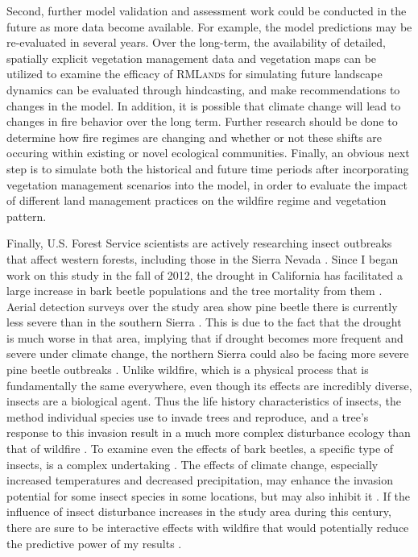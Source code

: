 Second, further model validation and assessment work could be conducted in the future as more data become available. For example, the model predictions may be re-evaluated in several years. Over the long-term, the availability of detailed, spatially explicit vegetation management data and vegetation maps can be utilized to examine the efficacy of \textsc{RMLands} for simulating future landscape dynamics can be evaluated through hindcasting, and make recommendations to changes in the model. In addition, it is possible that climate change will lead to changes in fire behavior over the long term. Further research should be done to determine how fire regimes are changing and whether or not these shifts are occuring within existing or novel ecological communities. Finally, an obvious next step is to simulate both the historical and future time periods after incorporating vegetation management scenarios into the model, in order to evaluate the impact of different land management practices on the wildfire regime and vegetation pattern.

Finally, U.S. Forest Service scientists are actively researching insect outbreaks that affect western forests, including those in the Sierra Nevada \citep{Liebhold2011}. Since I began work on this study in the fall of 2012, the drought in California has facilitated a large increase in bark beetle populations and the tree mortality from them \citep{Fimrite2016}. Aerial detection surveys over the study area show pine beetle there is currently less severe than in the southern Sierra \citep{Moore2015a,Moore2015b}. This is due to the fact that the drought is much worse in that area, implying that if drought becomes more frequent and severe under climate change, the northern Sierra could also be facing more severe pine beetle outbreaks \citep{Moore2015a,Moore2015b,Fimrite2016}. Unlike wildfire, which is a physical process that is fundamentally the same everywhere, even though its effects are incredibly diverse, insects are a biological agent. Thus the life history characteristics of insects, the method individual species use to invade trees and reproduce, and a tree's response to this invasion result in a much more complex disturbance ecology than that of wildfire \citep{Bentz2010}. To examine even the effects of bark beetles, a specific type of insects, is a complex undertaking \citep{Fettig2007}. The effects of climate change, especially increased temperatures and decreased precipitation, may enhance the invasion potential for some insect species in some locations, but may also inhibit it \citep{Logan2003,Bentz2010}. If the influence of insect disturbance increases in the study area during this century, there are sure to be interactive effects with wildfire that would potentially reduce the predictive power of my results \citep{Ferrell1996}.




